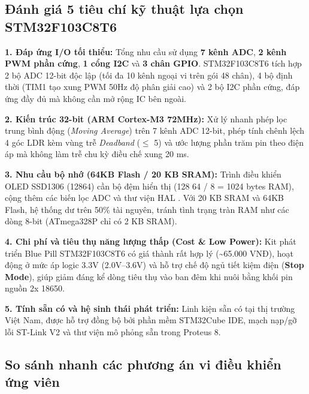 \documentclass[12pt,a4paper]{report}
\begin{document}
\subsection{Đánh giá 5 tiêu chí kỹ thuật lựa chọn STM32F103C8T6}

\textbf{1. Đáp ứng I/O tối thiểu:} Tổng nhu cầu sử dụng \textbf{7 kênh ADC}, \textbf{2 kênh PWM phần cứng}, \textbf{1 cổng I2C} và \textbf{3 chân GPIO}. STM32F103C8T6 tích hợp 2 bộ ADC 12-bit độc lập (tối đa 10 kênh ngoại vi trên gói 48 chân), 4 bộ định thời (TIM1 tạo xung PWM 50Hz độ phân giải cao) và 2 bộ I2C phần cứng, đáp ứng đầy đủ mà không cần mở rộng IC bên ngoài.

\textbf{2. Kiến trúc 32-bit (ARM Cortex-M3 72MHz):} Xử lý nhanh phép lọc trung bình động (\textit{Moving Average}) trên 7 kênh ADC 12-bit, phép tính chênh lệch 4 góc LDR kèm vùng trễ \textit{Deadband} (\ensuremath{\le} \textpm{}5\textdegree{}) và ước lượng phần trăm pin theo điện áp mà không làm trễ chu kỳ điều chế xung 20 ms.

\textbf{3. Nhu cầu bộ nhớ (64KB Flash / 20 KB SRAM):} Trình điều khiển OLED SSD1306 (128\texttimes{}64) cần bộ đệm hiển thị (128 \texttimes{} 64 / 8 = 1024 bytes RAM), cộng thêm các biến lọc ADC và thư viện HAL . Với 20 KB SRAM và 64KB Flash, hệ thống dư trên 50\% tài nguyên, tránh tình trạng tràn RAM như các dòng 8-bit (ATmega328P chỉ có 2 KB SRAM).

\textbf{4. Chi phí và tiêu thụ năng lượng thấp (Cost \& Low Power):} Kit phát triển Blue Pill STM32F103C8T6 có giá thành rất hợp lý (\textasciitilde{}65.000 VNĐ), hoạt động ở mức áp logic 3.3V (2.0V--3.6V) và hỗ trợ chế độ ngủ tiết kiệm điện (\textbf{Stop Mode}), giúp giảm đáng kể dòng tiêu thụ vào ban đêm khi nuôi bằng khối pin nguồn 2x 18650.

\textbf{5. Tính sẵn có và hệ sinh thái phát triển:} Linh kiện sẵn có tại thị trường Việt Nam, được hỗ trợ đồng bộ bởi phần mềm STM32Cube IDE, mạch nạp/gỡ lỗi ST-Link V2 và thư viện mô phỏng sẵn trong Proteus 8.

\subsection{So sánh nhanh các phương án vi điều khiển ứng viên}
\end{document}
